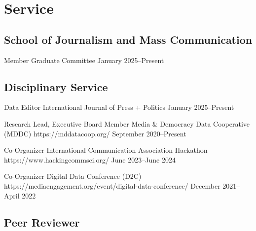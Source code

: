 \section{Service}

\subsection{School of Journalism and Mass Communication}

\cvservice
  {Member}
  {Graduate Committee}
  {}
  {January 2025--Present}

\subsection{Disciplinary Service}

\cvservice
  {Data Editor}
  {International Journal of Press + Politics}
  {}
  {January 2025--Present}

\cvservice
  {Research Lead, Executive Board Member}
  {Media \& Democracy Data Cooperative (MDDC)}
  {https://mddatacoop.org/}
  {September 2020--Present}

\cvservice
  {Co-Organizer}
  {International Communication Association Hackathon}
  {https://www.hackingcommsci.org/}
  {June 2023--June 2024}

\cvservice
  {Co-Organizer}
  {Digital Data Conference (D2C)}
  {https://mediaengagement.org/event/digital-data-conference/}
  {December 2021--April 2022}

\subsection{Peer Reviewer}

